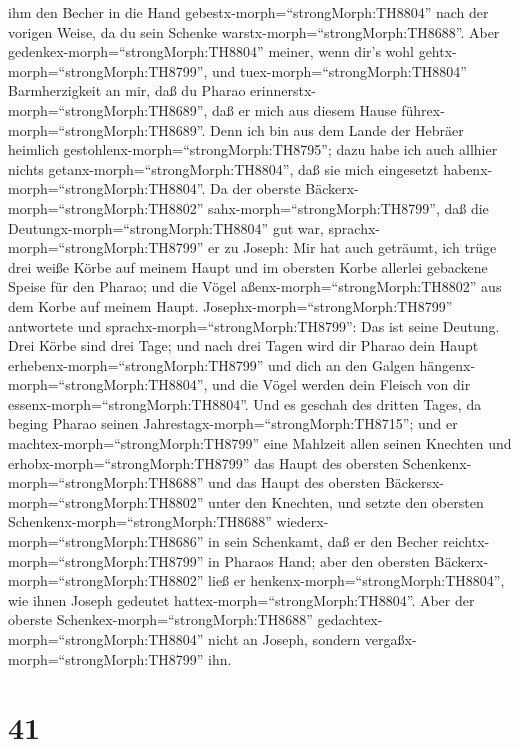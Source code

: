 ihm den Becher in die Hand gebestx-morph=``strongMorph:TH8804'' nach der
vorigen Weise, da du sein Schenke warstx-morph=``strongMorph:TH8688''.
 Aber gedenkex-morph=``strongMorph:TH8804'' meiner, wenn
dir's wohl gehtx-morph=``strongMorph:TH8799'', und
tuex-morph=``strongMorph:TH8804'' Barmherzigkeit an mir, daß du Pharao
erinnerstx-morph=``strongMorph:TH8689'', daß er mich aus diesem Hause
führex-morph=``strongMorph:TH8689''.  Denn ich bin aus dem
Lande der Hebräer heimlich gestohlenx-morph=``strongMorph:TH8795''; dazu
habe ich auch allhier nichts getanx-morph=``strongMorph:TH8804'', daß
sie mich eingesetzt habenx-morph=``strongMorph:TH8804''. 
Da der oberste Bäckerx-morph=``strongMorph:TH8802''
sahx-morph=``strongMorph:TH8799'', daß die
Deutungx-morph=``strongMorph:TH8804'' gut war,
sprachx-morph=``strongMorph:TH8799'' er zu Joseph: Mir hat auch
geträumt, ich trüge drei weiße Körbe auf meinem Haupt  und
im obersten Korbe allerlei gebackene Speise für den Pharao; und die
Vögel aßenx-morph=``strongMorph:TH8802'' aus dem Korbe auf meinem Haupt.
 Josephx-morph=``strongMorph:TH8799'' antwortete und
sprachx-morph=``strongMorph:TH8799'': Das ist seine Deutung. Drei Körbe
sind drei Tage;  und nach drei Tagen wird dir Pharao dein
Haupt erhebenx-morph=``strongMorph:TH8799'' und dich an den Galgen
hängenx-morph=``strongMorph:TH8804'', und die Vögel werden dein Fleisch
von dir essenx-morph=``strongMorph:TH8804''.  Und es
geschah des dritten Tages, da beging Pharao seinen
Jahrestagx-morph=``strongMorph:TH8715''; und er
machtex-morph=``strongMorph:TH8799'' eine Mahlzeit allen seinen Knechten
und erhobx-morph=``strongMorph:TH8799'' das Haupt des obersten
Schenkenx-morph=``strongMorph:TH8688'' und das Haupt des obersten
Bäckersx-morph=``strongMorph:TH8802'' unter den Knechten, 
und setzte den obersten Schenkenx-morph=``strongMorph:TH8688''
wiederx-morph=``strongMorph:TH8686'' in sein Schenkamt, daß er den
Becher reichtx-morph=``strongMorph:TH8799'' in Pharaos Hand;
 aber den obersten Bäckerx-morph=``strongMorph:TH8802''
ließ er henkenx-morph=``strongMorph:TH8804'', wie ihnen Joseph gedeutet
hattex-morph=``strongMorph:TH8804''.  Aber der oberste
Schenkex-morph=``strongMorph:TH8688''
gedachtex-morph=``strongMorph:TH8804'' nicht an Joseph, sondern
vergaßx-morph=``strongMorph:TH8799'' ihn.

\hypertarget{section-40}{%
\section{41}\label{section-40}}


